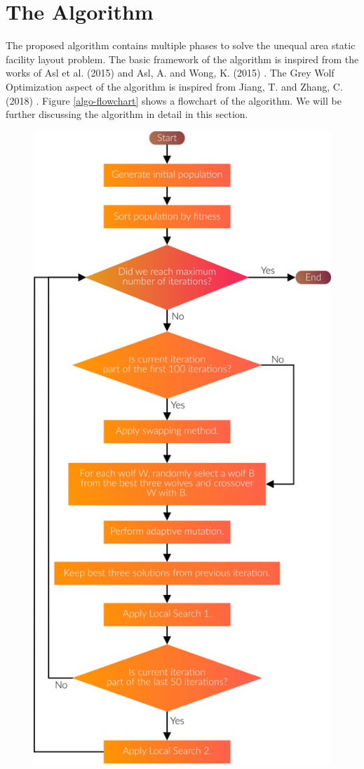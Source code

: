 \section{The Algorithm}
The proposed algorithm contains multiple phases to solve the unequal area static facility layout problem. The basic framework of the algorithm is inspired from the works of Asl et al. (2015) \cite{Asl2015} and Asl, A. and Wong, K. (2015) \cite{Asl2015}. The Grey Wolf Optimization aspect of the algorithm is inspired from Jiang, T. and Zhang, C. (2018) \cite{Jiang2018}. Figure \ref{algo-flowchart} shows a flowchart of the algorithm. We will be further discussing the algorithm in detail in this section.

\begin{figure}[h!]
	\centering
	\includegraphics{./images/chap05-methodology/flowchart.png}

\end{figure}

